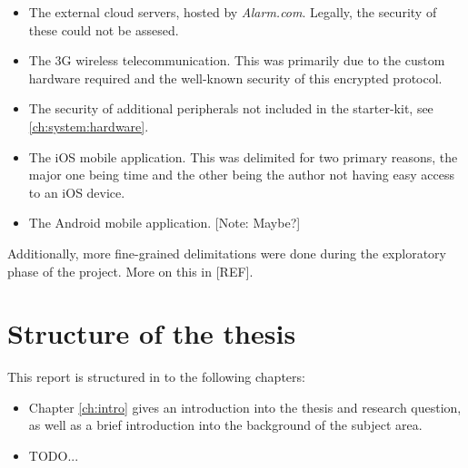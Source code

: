 \begin{itemize}
    \item The external cloud servers, hosted by \textit{Alarm.com}. Legally, the security of these could not be assesed.
    \item The 3G wireless telecommunication. This was primarily due to the custom hardware required and the well-known security of this encrypted protocol.
    \item The security of additional peripherals not included in the starter-kit, see \ref{ch:system:hardware}.
    \item The iOS mobile application. This was delimited for two primary reasons, the major one being time and the other being the author not having easy access to an iOS device.
    \item The Android mobile application. [Note: Maybe?]
\end{itemize}

\noindent Additionally, more fine-grained delimitations were done during the exploratory phase of the project. More on this in [REF].

\section{Structure of the thesis} \label{ch:intro:structure}
This report is structured in to the following chapters:
\begin{itemize}
    \item Chapter \ref{ch:intro} gives an introduction into the thesis and research question, as well as a brief introduction into the background of the subject area.
    \item TODO...
\end{itemize}
